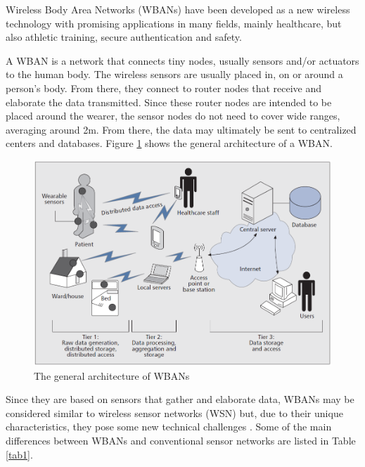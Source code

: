 \documentclass[conference]{IEEEtran}
\begin{document}
Wireless Body Area Networks (WBANs) have been developed as a new wireless technology with promising applications in many fields, mainly healthcare, but also athletic training, secure authentication and safety.

A WBAN is a network that connects tiny nodes, usually sensors and/or actuators to the human body. The wireless sensors are usually placed in, on or around a person’s body. From there, they connect to router nodes that receive and elaborate the data transmitted. Since these router nodes are intended to be placed around the wearer, the sensor nodes do not need to cover wide ranges, averaging around 2m. From there, the data may ultimately be sent to centralized centers and databases. Figure \ref{fig_WBAN_arch} shows the general architecture of a WBAN.

\begin{figure}[htbp]
\centering
\includegraphics[width=0.9\linewidth]{img/WBAN_arch.png}
\caption{The general architecture of WBANs}
\label{fig_WBAN_arch}
\end{figure}

Since they are based on sensors that gather and elaborate data, WBANs may be considered similar to wireless sensor networks (WSN) but, due to their unique characteristics, they pose some new technical challenges \cite{cao2009enabling}. Some of the main differences between WBANs and conventional sensor networks are listed in Table \ref{tab1}.
\end{document}
